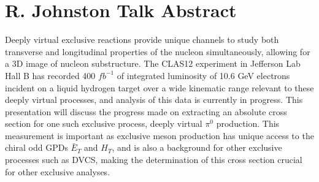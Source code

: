 \section{R. Johnston Talk Abstract}
Deeply virtual exclusive reactions provide unique channels to study both transverse and longitudinal properties of the nucleon simultaneously, allowing for a 3D image of nucleon substructure. The CLAS12 experiment in Jefferson Lab Hall B has recorded 400 $fb^{-1}$ of integrated luminosity of 10.6 GeV electrons incident on a liquid hydrogen target over a wide kinematic range relevant to these deeply virtual processes, and analysis of this data is currently in progress. This presentation will discuss the progress made on extracting an absolute cross section for one such exclusive process, deeply virtual $\pi^0$ production. This measurement is important as exclusive meson production has unique access to the chiral odd GPDs $\bar E_T$ and $H_T$, and is also a background for other exclusive processes such as DVCS, making the determination of this cross section crucial for other exclusive analyses.  